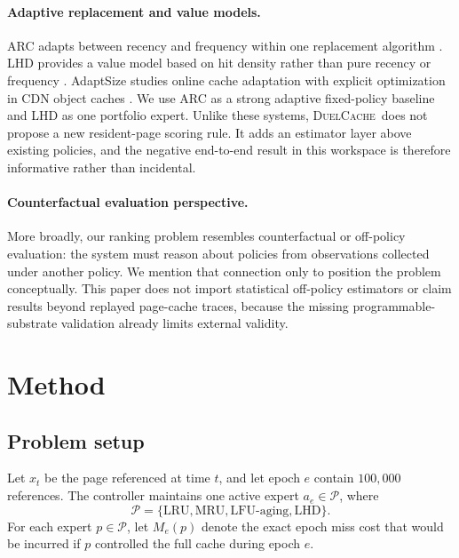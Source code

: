\documentclass{article}
\newcommand{\duel}{\textsc{DuelCache}}
\newcommand{\portfolio}{\mathcal{P}}
\begin{document}
\paragraph{Adaptive replacement and value models.}
ARC adapts between recency and frequency within one replacement algorithm \citep{megiddo2003arc}. LHD provides a value model based on hit density rather than pure recency or frequency \citep{beckmann2018lhd}. AdaptSize studies online cache adaptation with explicit optimization in CDN object caches \citep{berger2017adaptsize}. We use ARC as a strong adaptive fixed-policy baseline and LHD as one portfolio expert. Unlike these systems, \duel\ does not propose a new resident-page scoring rule. It adds an estimator layer above existing policies, and the negative end-to-end result in this workspace is therefore informative rather than incidental.

\paragraph{Counterfactual evaluation perspective.}
More broadly, our ranking problem resembles counterfactual or off-policy evaluation: the system must reason about policies from observations collected under another policy. We mention that connection only to position the problem conceptually. This paper does not import statistical off-policy estimators or claim results beyond replayed page-cache traces, because the missing programmable-substrate validation already limits external validity.

\section{Method}
\label{sec:method}

\subsection{Problem setup}

Let $x_t$ be the page referenced at time $t$, and let epoch $e$ contain $100{,}000$ references. The controller maintains one active expert $a_e \in \portfolio$, where
\[
\portfolio = \{\mathrm{LRU}, \mathrm{MRU}, \mathrm{LFU\mbox{-}aging}, \mathrm{LHD}\}.
\]
For each expert $p \in \portfolio$, let $M_e(p)$ denote the exact epoch miss cost that would be incurred if $p$ controlled the full cache during epoch $e$.
\end{document}

